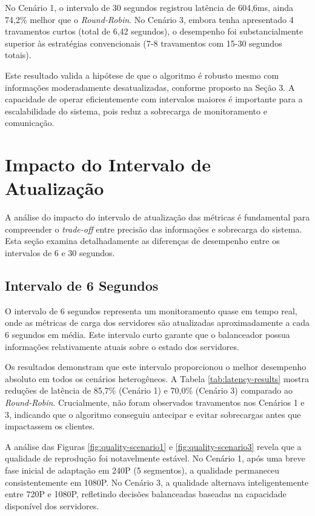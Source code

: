 No Cenário 1, o intervalo de 30 segundos registrou latência de 604,6ms, ainda 74,2\% melhor que o \textit{Round-Robin}. No Cenário 3, embora tenha apresentado 4 travamentos curtos (total de 6,42 segundos), o desempenho foi substancialmente superior às estratégias convencionais (7-8 travamentos com 15-30 segundos totais).

Este resultado valida a hipótese de que o algoritmo é robusto mesmo com informações moderadamente desatualizadas, conforme proposto na Seção 3. A capacidade de operar eficientemente com intervalos maiores é importante para a escalabilidade do sistema, pois reduz a sobrecarga de monitoramento e comunicação.

\section{Impacto do Intervalo de Atualização}

A análise do impacto do intervalo de atualização das métricas é fundamental para compreender o \textit{trade-off} entre precisão das informações e sobrecarga do sistema. Esta seção examina detalhadamente as diferenças de desempenho entre os intervalos de 6 e 30 segundos.

\subsection{Intervalo de 6 Segundos}

O intervalo de 6 segundos representa um monitoramento quase em tempo real, onde as métricas de carga dos servidores são atualizadas aproximadamente a cada 6 segundos em média. Este intervalo curto garante que o balanceador possua informações relativamente atuais sobre o estado dos servidores.

Os resultados demonstram que este intervalo proporcionou o melhor desempenho absoluto em todos os cenários heterogêneos. A Tabela \ref{tab:latency-results} mostra reduções de latência de 85,7\% (Cenário 1) e 70,0\% (Cenário 3) comparado ao \textit{Round-Robin}. Crucialmente, não foram observados travamentos nos Cenários 1 e 3, indicando que o algoritmo conseguiu antecipar e evitar sobrecargas antes que impactassem os clientes.

A análise das Figuras \ref{fig:quality-scenario1} e \ref{fig:quality-scenario3} revela que a qualidade de reprodução foi notavelmente estável. No Cenário 1, após uma breve fase inicial de adaptação em 240P (5 segmentos), a qualidade permaneceu consistentemente em 1080P. No Cenário 3, a qualidade alternava inteligentemente entre 720P e 1080P, refletindo decisões balanceadas baseadas na capacidade disponível dos servidores.

